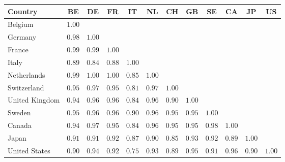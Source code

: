 \small
\setlength{\tabcolsep}{4pt}
\begin{tabular}{l ccccccccccc}
  \toprule
  Country & BE & DE & FR & IT & NL & CH & GB & SE & CA & JP & US \\
  \midrule
  Belgium        & $1.00$ &        &        &        &        &        &        &        &        &        &        \\
  Germany        & $0.98$ & $1.00$ &        &        &        &        &        &        &        &        &        \\
  France         & $0.99$ & $0.99$ & $1.00$ &        &        &        &        &        &        &        &        \\
  Italy          & $0.89$ & $0.84$ & $0.88$ & $1.00$ &        &        &        &        &        &        &        \\
  Netherlands    & $0.99$ & $1.00$ & $1.00$ & $0.85$ & $1.00$ &        &        &        &        &        &        \\
  Switzerland    & $0.95$ & $0.97$ & $0.95$ & $0.81$ & $0.97$ & $1.00$ &        &        &        &        &        \\
  United Kingdom & $0.94$ & $0.96$ & $0.96$ & $0.84$ & $0.96$ & $0.90$ & $1.00$ &        &        &        &        \\
  Sweden         & $0.95$ & $0.96$ & $0.96$ & $0.90$ & $0.96$ & $0.95$ & $0.95$ & $1.00$ &        &        &        \\
  Canada         & $0.94$ & $0.97$ & $0.95$ & $0.84$ & $0.96$ & $0.95$ & $0.95$ & $0.98$ & $1.00$ &        &        \\
  Japan          & $0.91$ & $0.91$ & $0.92$ & $0.87$ & $0.90$ & $0.85$ & $0.93$ & $0.92$ & $0.89$ & $1.00$ &        \\
  United States  & $0.90$ & $0.94$ & $0.92$ & $0.75$ & $0.93$ & $0.89$ & $0.95$ & $0.91$ & $0.96$ & $0.90$ & $1.00$ \\
  \bottomrule
\end{tabular}
